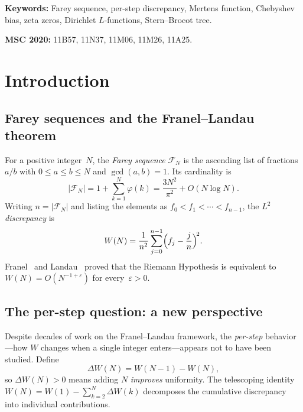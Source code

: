 \documentclass[11pt]{article}
\theoremstyle{definition}
\newcommand{\F}{\mathcal{F}}
\begin{document}
\medskip
\noindent\textbf{Keywords:} Farey sequence, per-step discrepancy,
Mertens function, Chebyshev bias, zeta zeros, Dirichlet $L$-functions,
Stern--Brocot tree.

\noindent\textbf{MSC 2020:} 11B57, 11N37, 11M06, 11M26, 11A25.



\section{Introduction}\label{sec:intro}

\subsection{Farey sequences and the Franel--Landau theorem}

For a positive integer~$N$, the \emph{Farey sequence} $\F_N$ is the
ascending list of fractions $a/b$ with $0 \le a \le b \le N$ and
$\gcd(a,b) = 1$.  Its cardinality is
\begin{equation}\label{eq:farey-size}
  |\F_N| = 1 + \sum_{k=1}^{N} \varphi(k)
  = \frac{3N^2}{\pi^2} + O(N \log N).
\end{equation}
Writing $n = |\F_N|$ and listing the elements as
$f_0 < f_1 < \cdots < f_{n-1}$, the \emph{$L^2$ discrepancy} is
\begin{equation}\label{eq:wobble}
  W(N) = \frac{1}{n^2} \sum_{j=0}^{n-1}
    \Bigl(f_j - \frac{j}{n}\Bigr)^{\!2}.
\end{equation}
Franel~\cite{Franel1924} and Landau~\cite{Landau1924} proved that the
Riemann Hypothesis is equivalent to $W(N) = O(N^{-1+\varepsilon})$ for
every~$\varepsilon > 0$.

\subsection{The per-step question: a new perspective}

Despite decades of work on the Franel--Landau framework, the
\emph{per-step} behavior---how $W$ changes when a single integer
enters---appears not to have been studied.  Define
\begin{equation}\label{eq:delta-w}
  \Delta W(N) = W(N{-}1) - W(N),
\end{equation}
so $\Delta W(N) > 0$ means adding $N$ \emph{improves} uniformity.
The telescoping identity $W(N) = W(1) - \sum_{k=2}^{N} \Delta W(k)$
decomposes the cumulative discrepancy into individual contributions.
\end{document}
